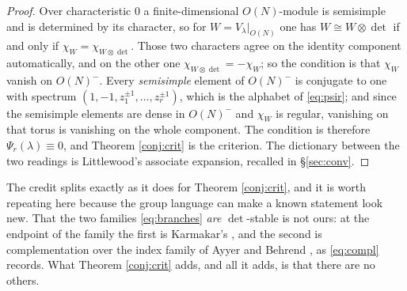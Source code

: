 \documentclass[11pt,reqno]{amsart}
\theoremstyle{plain}
\theoremstyle{definition}
\begin{document}
\begin{proof}
Over characteristic $0$ a finite-dimensional $O(N)$-module is semisimple and is determined by its
character, so for $W=V_\lambda|_{O(N)}$ one has $W\cong W\otimes\det$ if and only if
$\chi_W=\chi_{W\otimes\det}$. Those two characters agree on the identity component automatically, and
on the other one $\chi_{W\otimes\det}=-\chi_W$; so the condition is that $\chi_W$ vanish on
$O(N)^{-}$. Every \emph{semisimple} element of $O(N)^{-}$ is conjugate to one with spectrum
$(1,-1,z_1^{\pm1},\dots,z_r^{\pm1})$, which is the alphabet of \eqref{eq:psir}; and since the
semisimple elements are dense in $O(N)^{-}$ and $\chi_W$ is regular, vanishing on that torus is
vanishing on the whole component. The condition is therefore $\Psi_r(\lambda)\equiv0$, and Theorem
\ref{conj:crit} is the criterion. The dictionary between the two readings is Littlewood's associate
expansion, recalled in \S\ref{sec:conv}.
\end{proof}

\noindent The credit splits exactly as it does for Theorem \ref{conj:crit}, and it is worth repeating
here because the group language can make a known statement look new. That the two families
\eqref{eq:branches} \emph{are} $\det$-stable is not ours: at the endpoint of the family the first is
Karmakar's \cite[Theorem 4.1(A)]{Kar24}, and the second is complementation over the index family of
Ayyer and Behrend \cite{AB19}, as \eqref{eq:compl} records. What Theorem \ref{conj:crit} adds, and
all it adds, is that there are no others.
\end{document}
